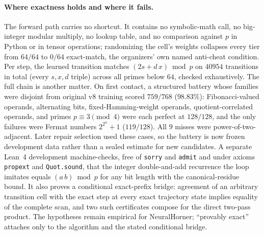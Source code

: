 \documentclass[11pt]{article}
\begin{document}
\paragraph{Where exactness holds and where it fails.}
The forward path carries no shortcut. It contains no symbolic-math call, no
big-integer modular multiply, no lookup table, and no comparison against $p$ in
Python or in tensor operations; randomizing the cell's weights collapses every
tier from $64/64$ to $0/64$ exact-match, the organizers' own named anti-cheat
condition. Per step, the learned transition matches $(2s + d\,x)\bmod p$ on
$40954$ transitions in total (every $s,x,d$ triple) across all primes below $64$, checked exhaustively.
The full chain is another matter. On first contact, a structured battery whose
families were disjoint from original v8 training scored $759/768$ ($98.83\%$):
Fibonacci-valued operands,
alternating bits, fixed-Hamming-weight operands, quotient-correlated operands,
and primes $p \equiv 3 \pmod 4$ were each perfect at $128/128$, and the only
failures were Fermat numbers $2^{2^n}+1$ ($119/128$). All $9$ misses were
power-of-two-adjacent. Later repair selection used these cases, so the battery is
now frozen development data rather than a sealed estimate for new candidates. A
separate Lean~4 development machine-checks, free of \texttt{sorry}
and \texttt{admit} and under axioms \texttt{propext} and \texttt{Quot.sound}, that
the integer double-and-add recurrence the loop imitates equals $(a\,b)\bmod p$ for
any bit length with the canonical-residue bound. It also proves a conditional
exact-prefix bridge: agreement of an arbitrary transition cell with the exact
step at every exact trajectory state implies equality of the complete scan, and
two such certificates compose for the direct two-pass product. The hypotheses
remain empirical for NeuralHorner; ``provably exact'' attaches only to the
algorithm and the stated conditional bridge.
\end{document}
